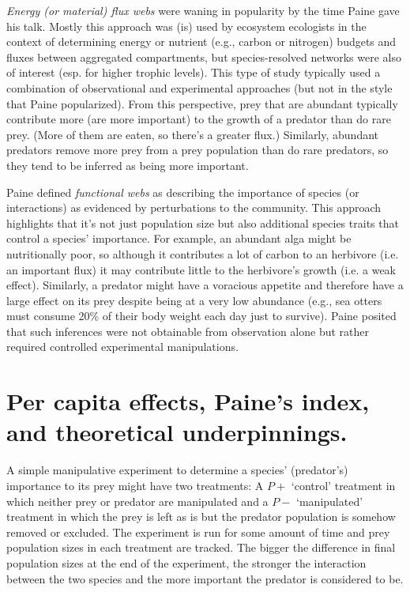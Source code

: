\documentclass[10pt,letterpaper]{article}
\begin{document}
\emph{Energy (or material) flux webs} were waning in popularity by the time Paine gave his talk.  Mostly this approach was (is) used by ecosystem ecologists in the context of determining energy or nutrient (e.g., carbon or nitrogen) budgets and fluxes between aggregated compartments, but species-resolved networks were also of interest (esp. for higher trophic levels).  This type of study typically used a combination of observational and experimental approaches (but not in the style that Paine popularized).  From this perspective, prey that are abundant typically contribute more (are more important) to the growth of a predator than do rare prey. (More of them are eaten, so there's a greater flux.)  Similarly, abundant predators remove more prey from a prey population than do rare predators, so they tend to be inferred as being more important.

Paine defined \emph{functional webs} as describing the importance of species (or interactions) as evidenced by perturbations to the community.  This approach highlights that it's not just population size but also additional species traits that control a species' importance.  For example, an abundant alga might be nutritionally poor, so although it contributes a lot of carbon to an herbivore (i.e. an important flux) it may contribute little to the herbivore's growth (i.e. a weak effect).  Similarly, a predator might have a voracious appetite and therefore have a large effect on its prey despite being at a very low abundance (e.g., sea otters must consume 20\% of their body weight each day just to survive).  Paine posited that such inferences were not obtainable from observation alone but rather required controlled experimental manipulations.



\section{Per capita effects, Paine's index, and theoretical underpinnings.}
\label{PaineIndex}
A simple manipulative experiment to determine a species' (predator's) importance to its prey might have two treatments:  A $P+$ `control' treatment in which neither prey or predator are manipulated and a $P-$ `manipulated' treatment in which the prey is left as is but the predator population is somehow removed or excluded.  The experiment is run for some amount of time and prey population sizes in each treatment are tracked. The bigger the difference in final population sizes at the end of the experiment, the stronger the interaction between the two species and the more important the predator is considered to be.
\end{document}
